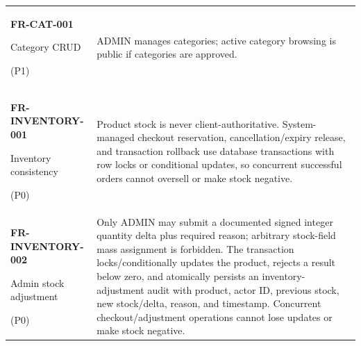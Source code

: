 \begin{longtable}{@{}p{44mm}p{109mm}@{}}
\textbf{FR-CAT-001}\par Category CRUD\par (P1) & ADMIN manages categories; active category browsing is public if categories are approved. \\
\textbf{FR-INVENTORY-001}\par Inventory consistency\par (P0) & Product stock is never client-authoritative. System-managed checkout reservation, cancellation/expiry release, and transaction rollback use database transactions with row locks or conditional updates, so concurrent successful orders cannot oversell or make stock negative. \\
\textbf{FR-INVENTORY-002}\par Admin stock adjustment\par (P0) & Only ADMIN may submit a documented signed integer quantity delta plus required reason; arbitrary stock-field mass assignment is forbidden. The transaction locks/conditionally updates the product, rejects a result below zero, and atomically persists an inventory-adjustment audit with product, actor ID, previous stock, new stock/delta, reason, and timestamp. Concurrent checkout/adjustment operations cannot lose updates or make stock negative. \\
\bottomrule
\end{longtable}

